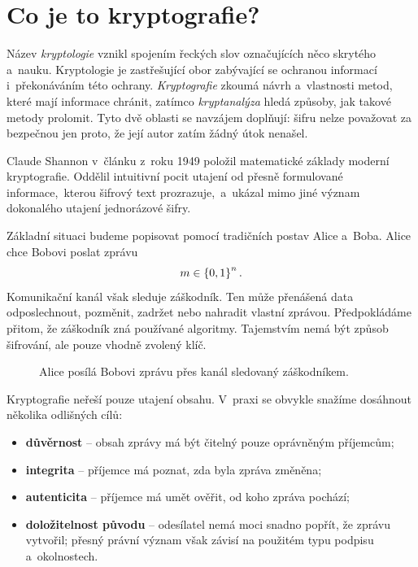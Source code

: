 \section{Co je to kryptografie?}\label{sec:krypto-uvod}

Název \emph{kryptologie} vznikl spojením řeckých slov označujících něco skrytého a~nauku. Kryptologie je zastřešující obor zabývající se ochranou informací i~překonáváním této ochrany. \emph{Kryptografie} zkoumá návrh a~vlastnosti metod, které mají informace chránit, zatímco \emph{kryptanalýza} hledá způsoby, jak takové metody prolomit. Tyto dvě oblasti se navzájem doplňují: šifru nelze považovat za bezpečnou jen proto, že její autor zatím žádný útok nenašel.

\begin{remark}
    Claude Shannon v~článku z~roku 1949 položil matematické základy moderní kryptografie. Oddělil intuitivní pocit utajení od přesně formulované informace,~kterou šifrový text prozrazuje,~a~ukázal mimo jiné význam dokonalého utajení jednorázové šifry.
\end{remark}

Základní situaci budeme popisovat pomocí tradičních postav Alice a~Boba. Alice chce Bobovi poslat zprávu
\[
    m\in\left\{0,1\right\}^{n}.
\]
Komunikační kanál však sleduje záškodník. Ten může přenášená data odposlechnout, pozměnit, zadržet nebo nahradit vlastní zprávou. Předpokládáme přitom, že záškodník zná používané algoritmy. Tajemstvím nemá být způsob šifrování, ale pouze vhodně zvolený klíč.

\begin{figure}[ht]
    \centering
    
    \caption{Alice posílá Bobovi zprávu přes kanál sledovaný záškodníkem.}
    \label{fig:krypto-komunikace}
\end{figure}

Kryptografie neřeší pouze utajení obsahu. V~praxi se obvykle snažíme dosáhnout několika odlišných cílů:
\begin{itemize}
    \item \textbf{důvěrnost} -- obsah zprávy má být čitelný pouze oprávněným příjemcům;
    \item \textbf{integrita} -- příjemce má poznat, zda byla zpráva změněna;
    \item \textbf{autenticita} -- příjemce má umět ověřit, od koho zpráva pochází;
    \item \textbf{doložitelnost původu} -- odesílatel nemá moci snadno popřít, že zprávu vytvořil; přesný právní význam však závisí na použitém typu podpisu a~okolnostech.
\end{itemize}

